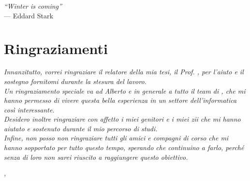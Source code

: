 
\cleardoublepage
{}
{}

\begin{flushright}{
 \slshape    
 ``Winter is coming''} \\ 
	\medskip
    --- Eddard Stark
\end{flushright}



\begingroup
\let\clearpage\relax
\let\cleardoublepage\relax
\let\cleardoublepage\relax

\chapter*{Ringraziamenti}

\noindent \textit{Innanzitutto, vorrei ringraziare il relatore della mia tesi, il Prof. \myProf, per l'aiuto e il sostegno fornitomi durante la stesura del lavoro.}\\

\noindent \textit{Un ringraziamento speciale va ad Alberto e in generale a tutto il team di \myCompany , che mi hanno permesso di vivere questa bella esperienza in un settore dell'informatica così interessante.}\\

\noindent \textit{Desidero inoltre ringraziare con affetto i miei genitori e i miei zii che mi hanno aiutato e sostenuto durante il mio percorso di studi.}\\

\noindent \textit{Infine, non posso non ringraziare tutti gli amici e compagni di corso che mi hanno sopportato per tutto questo tempo, sperando che continuino a farlo, perché senza di loro non sarei riuscito a raggiungere questo obiettivo.}\\

\bigskip

\noindent\textit{\myLocation, \myTime}
\hfill \myName

\endgroup

